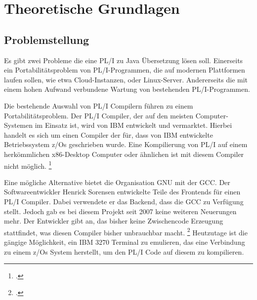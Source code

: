 




\section{Theoretische Grundlagen}
\subsection{Problemstellung}
	
Es gibt zwei Probleme die eine PL/I zu Java Übersetzung lösen soll. 
Einerseits ein Portabilitätsproblem von PL/I-Programmen, die auf modernen Plattformen laufen sollen, wie etwa Cloud-Instanzen, oder Linux-Server. Andererseits die mit einem hohen Aufwand verbundene Wartung von bestehenden PL/I-Programmen. 
	
Die bestehende Auswahl von PL/I Compilern führen zu einem Portabilitätsproblem. Der PL/I Compiler, der auf den meisten Computer-Systemen im Einsatz ist, wird von IBM entwickelt und vermarktet. Hierbei handelt es sich um einen Compiler der für, dass von IBM entwickelte Betriebssystem z/Os geschrieben wurde. Eine Kompilierung von PL/I auf einem herkömmlichen x86-Desktop Computer oder ähnlichen ist mit diesem Compiler nicht möglich. \footcite[Vgl. ][]{plicomp}


Eine mögliche Alternative bietet die Organisation GNU mit der \ac{GCC}. Der Softwareentwickler Henrick Sorensen entwickelte Teile des Frontends für einen PL/I Compiler. Dabei verwendete er das Backend, dass die \ac{GCC} zu Verfügung stellt. Jedoch gab es bei diesem Projekt seit 2007 keine weiteren Neuerungen mehr. Der Entwickler gibt an, das bisher keine Zwischencode Erzeugung stattfindet, was diesen Compiler bisher unbrauchbar macht. \footcite[Vgl. ][]{pligcc} 
Heutzutage ist die gängige Möglichkeit, ein IBM 3270 Terminal zu emulieren, das eine Verbindung zu einem z/Os System herstellt, um den PL/I Code auf diesem zu kompilieren.


